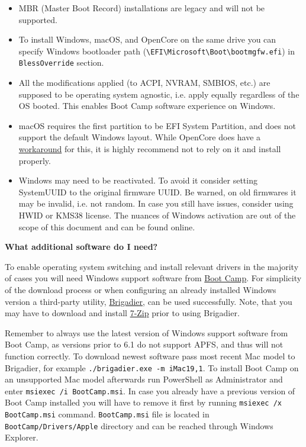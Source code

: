 \documentclass[]{article}
\begin{document}
  \begin{itemize}
  \item MBR (Master Boot Record) installations are legacy and will not be supported.
  \item To install Windows, macOS, and OpenCore on the same drive you can specify
  Windows bootloader path
  (\texttt{\textbackslash EFI\textbackslash Microsoft\textbackslash Boot\textbackslash bootmgfw.efi})
  in \texttt{BlessOverride} section.
  \item All the modifications applied (to ACPI, NVRAM, SMBIOS, etc.) are supposed
  to be operating system agnostic, i.e. apply equally regardless of the OS booted.
  This enables Boot Camp software experience on Windows.
  \item macOS requires the first partition to be EFI System Partition, and does
  not support the default Windows layout. While OpenCore does have a
  \href{https://github.com/acidanthera/bugtracker/issues/327}{workaround}
  for this, it is highly recommend not to rely on it and install properly.
  \item Windows may need to be reactivated. To avoid it consider
  setting SystemUUID to the original firmware UUID. Be warned,
  on old firmwares it may be invalid, i.e. not random. In case you still have issues,
  consider using HWID or KMS38 license. The nuances of Windows activation are out of the
  scope of this document and can be found online.
  \end{itemize}

  \textbf{What additional software do I need?}

  To enable operating system switching and install relevant drivers in the majority of
  cases you will need Windows support software from
  \href{https://support.apple.com/boot-camp}{Boot Camp}. For simplicity of the download
  process or when configuring an already installed Windows version a third-party utility,
  \href{https://github.com/timsutton/brigadier}{Brigadier}, can be used successfully.
  Note, that you may have to download and install \href{https://www.7-zip.org}{7-Zip}
  prior to using Brigadier.

  Remember to always use the latest version of Windows support software from Boot Camp,
  as versions prior to 6.1 do not support APFS, and thus will not function correctly.
  To download newest software pass most recent Mac model to Brigadier, for example
  \texttt{./brigadier.exe -m iMac19,1}. To install Boot Camp on an unsupported Mac model
  afterwards run PowerShell as Administrator and enter \texttt{msiexec /i BootCamp.msi}.
  In case you already have a previous version of Boot Camp installed you will have to
  remove it first by running \texttt{msiexec /x BootCamp.msi} command. \texttt{BootCamp.msi}
  file is located in \texttt{BootCamp/Drivers/Apple} directory and can be reached through
  Windows Explorer.
\end{document}
